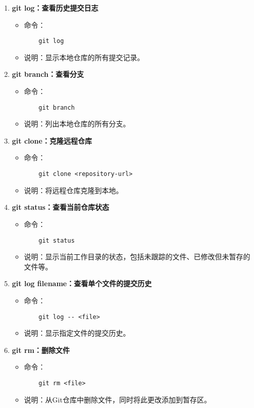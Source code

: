 \documentclass[UTF8]{ctexart}
\begin{document}
\begin{enumerate}
  \item \textbf{git log：查看历史提交日志}
  \begin{itemize}
    \item 命令：
    \begin{verbatim}
    git log
    \end{verbatim}
    \item 说明：显示本地仓库的所有提交记录。
  \end{itemize}

  \item \textbf{git branch：查看分支}
  \begin{itemize}
    \item 命令：
    \begin{verbatim}
    git branch
    \end{verbatim}
    \item 说明：列出本地仓库的所有分支。
  \end{itemize}

  \item \textbf{git clone：克隆远程仓库}
  \begin{itemize}
    \item 命令：
    \begin{verbatim}
    git clone <repository-url>
    \end{verbatim}
    \item 说明：将远程仓库克隆到本地。
  \end{itemize}

  \item \textbf{git status：查看当前仓库状态}
  \begin{itemize}
    \item 命令：
    \begin{verbatim}
    git status
    \end{verbatim}
    \item 说明：显示当前工作目录的状态，包括未跟踪的文件、已修改但未暂存的文件等。
  \end{itemize}

  \item \textbf{git log filename：查看单个文件的提交历史}
  \begin{itemize}
    \item 命令：
    \begin{verbatim}
    git log -- <file>
    \end{verbatim}
    \item 说明：显示指定文件的提交历史。
  \end{itemize}

  \item \textbf{git rm：删除文件}
  \begin{itemize}
    \item 命令：
    \begin{verbatim}
    git rm <file>
    \end{verbatim}
    \item 说明：从Git仓库中删除文件，同时将此更改添加到暂存区。
  \end{itemize}
\end{enumerate}
\end{document}
